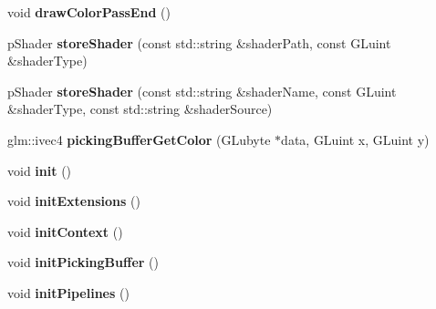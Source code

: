 \begin{DoxyCompactItemize}
\item 
\hypertarget{structfillwave_1_1Engine_1_1EngineImpl_aa7f987143c09c27f6d98470c9ebadf60}{}void {\bfseries draw\+Color\+Pass\+End} ()\label{structfillwave_1_1Engine_1_1EngineImpl_aa7f987143c09c27f6d98470c9ebadf60}

\item 
\hypertarget{structfillwave_1_1Engine_1_1EngineImpl_aeaa89cb8d068ccf8e7404fa0d6682024}{}p\+Shader {\bfseries store\+Shader} (const std\+::string \&shader\+Path, const G\+Luint \&shader\+Type)\label{structfillwave_1_1Engine_1_1EngineImpl_aeaa89cb8d068ccf8e7404fa0d6682024}

\item 
\hypertarget{structfillwave_1_1Engine_1_1EngineImpl_ab676c0581fffada7c179aa188e9b5a37}{}p\+Shader {\bfseries store\+Shader} (const std\+::string \&shader\+Name, const G\+Luint \&shader\+Type, const std\+::string \&shader\+Source)\label{structfillwave_1_1Engine_1_1EngineImpl_ab676c0581fffada7c179aa188e9b5a37}

\item 
\hypertarget{structfillwave_1_1Engine_1_1EngineImpl_a993f079d8688f6e9d647fb9d8c861a31}{}glm\+::ivec4 {\bfseries picking\+Buffer\+Get\+Color} (G\+Lubyte $\ast$data, G\+Luint x, G\+Luint y)\label{structfillwave_1_1Engine_1_1EngineImpl_a993f079d8688f6e9d647fb9d8c861a31}

\item 
\hypertarget{structfillwave_1_1Engine_1_1EngineImpl_a677027e42098fba43736efb0f9565e4b}{}void {\bfseries init} ()\label{structfillwave_1_1Engine_1_1EngineImpl_a677027e42098fba43736efb0f9565e4b}

\item 
\hypertarget{structfillwave_1_1Engine_1_1EngineImpl_a50f486d35afbff9cb79cf658037da4a8}{}void {\bfseries init\+Extensions} ()\label{structfillwave_1_1Engine_1_1EngineImpl_a50f486d35afbff9cb79cf658037da4a8}

\item 
\hypertarget{structfillwave_1_1Engine_1_1EngineImpl_ab65e9b93533e6bdbec741485ce8a3714}{}void {\bfseries init\+Context} ()\label{structfillwave_1_1Engine_1_1EngineImpl_ab65e9b93533e6bdbec741485ce8a3714}

\item 
\hypertarget{structfillwave_1_1Engine_1_1EngineImpl_ada68b25e7af386ad0049d3125a670d66}{}void {\bfseries init\+Picking\+Buffer} ()\label{structfillwave_1_1Engine_1_1EngineImpl_ada68b25e7af386ad0049d3125a670d66}

\item 
\hypertarget{structfillwave_1_1Engine_1_1EngineImpl_afc91d2ecbd80f4ec48c0eb34cce1d43a}{}void {\bfseries init\+Pipelines} ()\label{structfillwave_1_1Engine_1_1EngineImpl_afc91d2ecbd80f4ec48c0eb34cce1d43a}


\end{DoxyCompactItemize}
